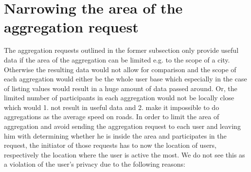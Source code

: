  \section{Narrowing the area of the aggregation request}
 The aggregation requests outlined in the former subsection only provide useful data if the area of the aggregation can be limited e.g. to the scope of a city. Otherwise the resulting data would not allow for comparison and the scope of each aggregation would either be the whole user base which especially in the case of listing values would result in a huge amount of data passed around. Or, the limited number of participants in each aggregation would not be locally close which would 1. not result in useful data and 2. make it impossible to do aggregations as the average speed on roads. 
 In order to limit the area of aggregation and avoid sending the aggregation request to each user and leaving him with determining whether he is inside the area and participates in the request, the initiator of those requests has to now the location of users, respectively the location where the user is active the most.
 We do not see this as a violation of the user's privacy due to the following reasons:
